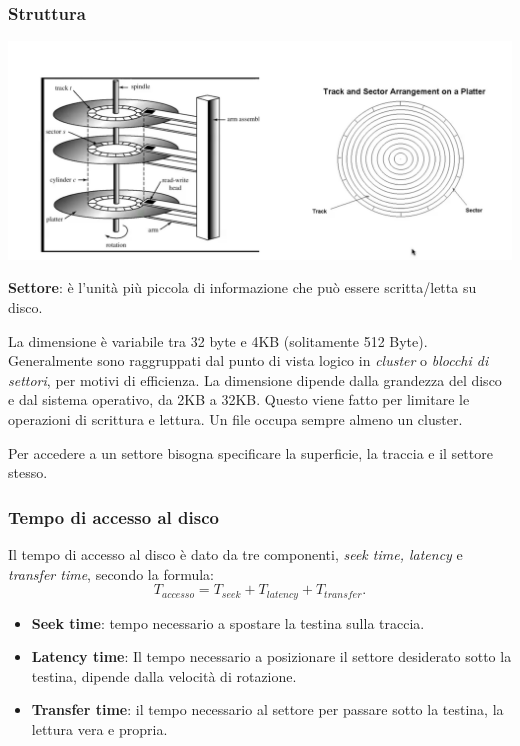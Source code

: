 \documentclass[a4paper,12pt, twoside]{report}
\newcommand{\defbox}[1]{\noindent\colorbox{shadecolor}
{\parbox{\dimexpr\textwidth-2\fboxsep\relax}{#1}}}
\begin{document}
\subsubsection{Struttura}
\begin{center}
    \includegraphics[scale=0.15]{hdd_structure}
\end{center}

\defbox{\textbf{Settore}: \`e l'unit\`a pi\`u piccola di informazione che pu\`o essere scritta/letta su disco.}

La dimensione \`e variabile tra 32 byte e 4KB (solitamente 512 Byte). Generalmente sono raggruppati dal punto 
di vista logico in \emph{cluster} o \emph{blocchi di settori}, per motivi di efficienza. La dimensione dipende
dalla grandezza del disco e dal sistema operativo, da 2KB a 32KB. Questo viene fatto per limitare le operazioni
di scrittura e lettura. Un file occupa sempre almeno un cluster.

Per accedere a un settore bisogna specificare la superficie, la traccia e il settore stesso. 

\subsubsection{Tempo di accesso al disco}

Il tempo di accesso al disco \`e dato da tre componenti,  \emph{seek time, latency} e \emph{transfer time}, secondo 
la formula:
\[ T_{accesso} = T_{seek} + T_{latency} + T_{transfer}.\]
\begin{itemize}
    \item \defbox{\textbf{Seek time}: tempo necessario a spostare la testina sulla traccia.}
    \item \defbox{\textbf{Latency time}: Il tempo necessario a posizionare il settore desiderato sotto la 
    testina, dipende dalla velocit\`a di rotazione.}
    \item \defbox{\textbf{Transfer time}: il tempo necessario al settore per passare sotto la testina, la
    lettura vera e propria.}
\end{itemize}
\end{document}
